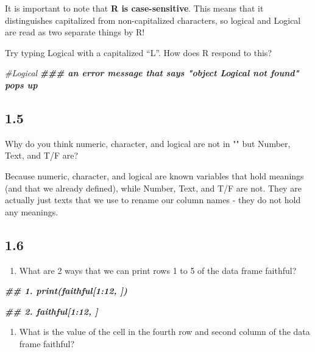 \documentclass[
]{book}
\newenvironment{Shaded}{\begin{snugshade}}{\end{snugshade}}
\newcommand{\CommentTok}[1]{\textcolor[rgb]{0.56,0.35,0.01}{\textit{#1}}}
\newcommand{\DocumentationTok}[1]{\textcolor[rgb]{0.56,0.35,0.01}{\textbf{\textit{#1}}}}
\providecommand{\tightlist}{%
  \setlength{\itemsep}{0pt}\setlength{\parskip}{0pt}}
\begin{document}
It is important to note that \textbf{R is case-sensitive}. This means that it distinguishes capitalized from non-capitalized characters, so logical and Logical are read as two separate things by R!

Try typing Logical with a capitalized ``L''. How does R respond to this?

\begin{Shaded}
\begin{Highlighting}[]
\CommentTok{\#Logical}
    \DocumentationTok{\#\#\# an error message that says "object \textquotesingle{}Logical\textquotesingle{} not found" pops up}
\end{Highlighting}
\end{Shaded}

\hypertarget{section-4}{%
\subsection{1.5}\label{section-4}}

Why do you think numeric, character, and logical are not in "" but Number, Text, and T/F are?

Because numeric, character, and logical are known variables that hold meanings (and that we already defined), while Number, Text, and T/F are not. They are actually just texts that we use to rename our column names - they do not hold any meanings.

\hypertarget{section-5}{%
\subsection{1.6}\label{section-5}}

\begin{enumerate}
\def\labelenumi{\arabic{enumi}.}
\tightlist
\item
  What are 2 ways that we can print rows 1 to 5 of the data frame faithful?
\end{enumerate}

\begin{Shaded}
\begin{Highlighting}[]
\DocumentationTok{\#\# 1. print(faithful[1:12, ])}

\DocumentationTok{\#\# 2. faithful[1:12, ]}
\end{Highlighting}
\end{Shaded}

\begin{enumerate}
\def\labelenumi{\arabic{enumi}.}
\setcounter{enumi}{1}
\tightlist
\item
  What is the value of the cell in the fourth row and second column of the data frame faithful?
\end{enumerate}
\end{document}

